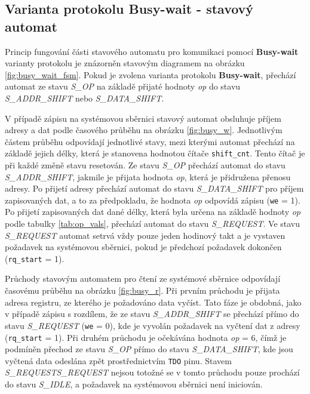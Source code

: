 \subsection{Varianta protokolu Busy-wait - stavový automat} \label{subsec:busy-wait-fsm}
Princip fungování části stavového automatu pro komunikaci pomocí \textbf{Busy-wait} varianty protokolu je znázorněn stavovým diagramem na obrázku \ref{fig:busy_wait_fsm}. Pokud je zvolena varianta protokolu \textbf{Busy-wait}, přechází automat ze stavu \textit{S\_OP} na základě přijaté hodnoty \textit{op} do stavu \textit{S\_ADDR\_SHIFT} nebo \textit{S\_DATA\_SHIFT}.

V případě zápisu na systémovou sběrnici stavový automat obsluhuje příjem adresy a dat podle časového průběhu na obrázku \ref{fig:busy_w}. Jednotlivým částem průběhu odpovídají jednotlivé stavy, mezi kterými automat přechází na základě jejich délky, která je stanovena hodnotou čítače \texttt{shift\_cnt}. Tento čítač je při každé změně stavu resetován. Ze stavu \textit{S\_OP} přechází automat do stavu \textit{S\_ADDR\_SHIFT}, jakmile je přijata hodnota \textit{op}, která je přidružena přenosu adresy. Po přijetí adresy přechází automat do stavu \textit{S\_DATA\_SHIFT} pro příjem zapisovaných dat, a to za předpokladu, že hodnota \textit{op} odpovídá zápisu (\texttt{we} = 1). Po přijetí zapisovaných dat dané délky, která byla určena na základě hodnoty \textit{op} podle tabulky \ref{tab:op_vals}, přechází automat do stavu \textit{S\_REQUEST}. Ve stavu \textit{S\_REQUEST} automat setrvá vždy pouze jeden hodinový takt a je vystaven požadavek na systémovou sběrnici, pokud je předchozí požadavek dokončen (\texttt{rq\_start} = 1).

Průchody stavovým automatem pro čtení ze systémové sběrnice odpovídají časovému průběhu na obrázku \ref{fig:busy_r}. Při prvním průchodu je přijata adresa registru, ze kterého je požadováno data vyčíst. Tato fáze je obdobná, jako v případě zápisu s rozdílem, že ze stavu \textit{S\_ADDR\_SHIFT} se přechází přímo do stavu \textit{S\_REQUEST} (\texttt{we} = 0), kde je vyvolán požadavek na vyčtení dat z adresy (\texttt{rq\_start} = 1). Při druhém průchodu je očekávána hodnota \textit{op} = 6, čímž je podmíněn přechod ze stavu \textit{S\_OP} přímo do stavu \textit{S\_DATA\_SHIFT}, kde jsou vyčtená data odeslána zpět prostřednictvím \texttt{\acs{TDO}} pinu. Stavem \textit{S\_REQUEST}\textit{S\_REQUEST} nejsou totožné  se v tomto průchodu pouze prochází do stavu \textit{S\_IDLE}, a požadavek na systémovou sběrnici není iniciován.

